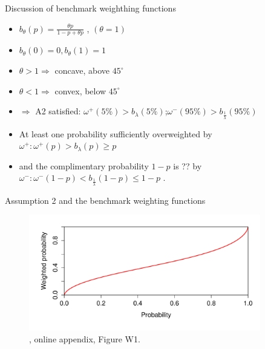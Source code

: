 \documentclass[11pt, aspectratio=169]{beamer}
\begin{document}
\begin{frame}{Discussion of benchmark weighthing functions}
    \begin{itemize}
        \item $b_\theta (p)=\frac{\theta p}{1-p+\theta p} $ , $ (\theta=1)$ \medskip
        \item $b_\theta(0)=0, b_\theta(1)=1$\medskip
        \item $\theta>1 \Rightarrow$ concave, above $45^{ \circ}$\medskip
        \item $\theta<1 \Rightarrow$ convex, below $45^{ \circ}$\medskip
        \item $\Rightarrow$ A2 satisfied: $\omega ^{+}(5\%)> b_\lambda(5\%) $;\quad $ \omega ^{-}(95\%)> b_\frac{1}{\lambda}(95\%) $\medskip
        \item At least one probability sufficiently overweighted by $\omega^+ : \omega^+(p)>b_{\lambda}(p) \geq p$\medskip
        \item and the complimentary probability $1-p$ is ?? by $\omega^- :\omega^-(1-p) < b_{\frac{1}{\lambda}}(1-p) \leq 1-p$ .\medskip
	\end{itemize}
\end{frame}

\begin{frame}{Assumption 2 and the benchmark weighting functions}
    \begin{figure}
        \centering
        \includegraphics[width = 0.9\textwidth]{decomposition_distortions1}
        \caption{\citet{EbertStrack2015}, online appendix, Figure W1.}
    \end{figure}
\end{frame}
\end{document}
